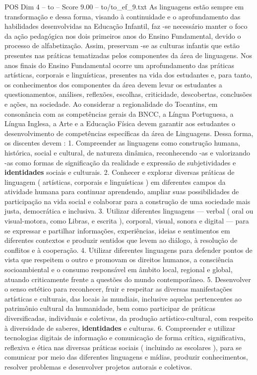 \begin{textsample}{POS Dim 4 – to – Score 9.00 – to/to\_ef\_9.txt}
As linguagens estão sempre em transformação e dessa forma, visando à continuidade e o aprofundamento das habilidades desenvolvidas na Educação Infantil, faz -se necessário manter o foco da ação pedagógica nos dois primeiros anos do Ensino Fundamental, devido o processo de alfabetização.
Assim, preservam -se as culturas infantis que estão presentes nas práticas tematizadas pelos componentes da área de linguagens.
Nos anos finais do Ensino Fundamental ocorre um aprofundamento das práticas artísticas, corporais e linguísticas, presentes na vida dos estudantes e, para tanto, os conhecimentos dos componentes da área devem levar os estudantes a questionamentos, análises, reflexões, escolhas, criticidade, descobertas, conclusões e ações, na sociedade.
Ao considerar a regionalidade do Tocantins, em consonância com as competências gerais da BNCC, a Língua Portuguesa, a Língua Inglesa, a Arte e a Educação Física devem garantir aos estudantes o desenvolvimento de competências específicas da área de Linguagens.
Dessa forma, os discentes devem : 1.
Compreender as linguagens como construção humana, histórica, social e cultural, de natureza dinâmica, reconhecendo -as e valorizando -as como formas de significação da realidade e expressão de subjetividades e \textbf{identidades} sociais e culturais. 2.
Conhecer e explorar diversas práticas de linguagem ( artísticas, corporais e linguísticas ) em diferentes campos da atividade humana para continuar aprendendo, ampliar suas possibilidades de participação na vida social e colaborar para a construção de uma sociedade mais justa, democrática e inclusiva. 3.
Utilizar diferentes linguagens — verbal ( oral ou visual-motora, como Libras, e escrita ), corporal, visual, sonora e digital — para se expressar e partilhar informações, experiências, ideias e sentimentos em diferentes contextos e produzir sentidos que levem ao diálogo, à resolução de conflitos e à cooperação. 4.
Utilizar diferentes linguagens para defender pontos de vista que respeitem o outro e promovam os direitos humanos, a consciência socioambiental e o consumo responsável em âmbito local, regional e global, atuando criticamente frente a questões do mundo contemporâneo. 5.
Desenvolver o senso estético para reconhecer, fruir e respeitar as diversas manifestações artísticas e culturais, das locais às mundiais, inclusive aquelas pertencentes ao patrimônio cultural da humanidade, bem como participar de práticas diversificadas, individuais e coletivas, da produção artístico-cultural, com respeito à diversidade de saberes, \textbf{identidades} e culturas. 6.
Compreender e utilizar tecnologias digitais de informação e comunicação de forma crítica, significativa, reflexiva e ética nas diversas práticas sociais ( incluindo as escolares ), para se comunicar por meio das diferentes linguagens e mídias, produzir conhecimentos, resolver problemas e desenvolver projetos autorais e coletivos.

\end{textsample}
